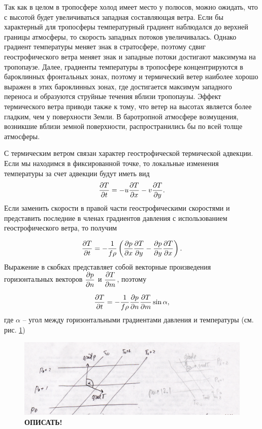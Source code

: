Так как в целом в тропосфере холод имеет место у полюсов, можно ожидать, что с высотой будет увеличиваться западная составляющая ветра. Если бы характерный для тропосферы температурный градиент наблюдался до верхней границы атмосферы, то скорость западных потоков увеличивалась. Однако градиент температуры меняет знак в стратосфере, поэтому сдвиг геострофического ветра меняет знак и западные потоки достигают максимума на тропопаузе. Далее, градиенты температуры в тропосфере концентрируются в бароклинных фронтальных  зонах, поэтому и термический ветер  наиболее хорошо выражен в этих бароклинных зонах, где достигается максимум западного переноса и образуются струйные течения вблизи тропопаузы. Эффект термического ветра приводи также к тому, что ветер на высотах является более гладким, чем у поверхности Земли. В баротропной атмосфере возмущения, возникшие вблизи земной поверхности, распространились бы по всей толще атмосферы. 

С термическим ветром связан характер геострофической термической адвекции. Если мы находимся в фиксированной точке, то локальные изменения температуры за счет адвекции будут иметь вид 
\begin{equation}
    \label{eq:ch12_js1}
    \displaystyle\frac{\partial T}{\partial t} = -u\displaystyle\frac{\partial T}{\partial x}-v\displaystyle\frac{\partial T}{\partial y}.
\end{equation}
Если заменить скорости в правой части геострофическими скоростями и представить последние в членах градиентов давления с использованием геострофического ветра, то получим

\begin{equation}
    \label{eq:ch12_js2}
    \displaystyle\frac{\partial T}{\partial t} = -\frac{1}{f\rho} \displaystyle \left(  \displaystyle\frac{\partial p}{\partial x}\displaystyle\frac{\partial T}{\partial y} - \displaystyle\frac{\partial p}{\partial y}\displaystyle\frac{\partial T}{\partial x}  \right).
\end{equation}
Выражение в скобках представляет собой векторные произведения горизонтальных векторов $\displaystyle\frac{\partial p}{\partial n}$ и $\displaystyle\frac{\partial T}{\partial m}$, поэтому

\begin{equation}
    \label{eq:ch12_js3}
    \displaystyle\frac{\partial T}{\partial t} = -\frac{1}{f\rho}\displaystyle\frac{\partial p}{\partial n}\displaystyle\frac{\partial T}{\partial m} \sin{\alpha},
\end{equation}
где $\alpha$ -- угол между горизонтальными градиентами давления и температуры (см. рис. \ref{fig:ch12.1})

    \begin{figure}[h]
    \centering
    \includegraphics[width=0.7\linewidth]{pics/ch12.1.png}
    \caption{\label{fig:ch12.1}
    {\color{red} \textbf{ОПИСАТЬ!}}
    }
    \end{figure}    

